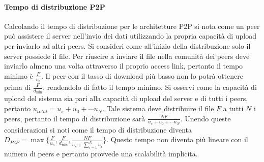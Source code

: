 \paragraph{Tempo di distribuzione P2P}
Calcolando il tempo di distribuzione per le architetture P2P si nota come un peer pu\`o assistere il server nell'invio dei dati utilizzando la propria 
capacit\`a di upload per inviarlo ad altri peers. Si consideri come all'inizio della distribuzione solo il server possiede il file. Per riuscire a inviare 
il file nella comunit\`a dei peers deve inviarlo almeno una volta attraverso il proprio access link, pertanto il tempo minimo \`e $\frac{F}{u_s}$. Il peer
con il tasso di download pi\`u basso non lo potr\`a ottenere prima di $\frac{F}{d_{\min}}$, rendendolo di fatto il tempo minimo. Si osservi come la 
capacit\`a di upload del sistema sia pari alla capacit\`a di upload del server e di tutti i peers, pertanto $u_{total}=u_s+u_0+\cdots u_N$. Tale sistema 
deve distribuire il file $F$ a tutti $N$ i peers, pertanto il tempo di distribuzione sar\`a $\frac{NF}{u_s+u_0+\cdots u_N}$. Unendo queste considerazioni si 
noti come il tempo di distribuzione diventa $D_{P2P}=\max\{\frac{F}{u_s}, \frac{F}{d_{\min}}, \frac{NF}{u_s+\sum\limits_{i=1}^Nu_i}\}$. Questo tempo non 
diventa pi\`u lineare con il numero di peers e pertanto provvede una scalabilit\`a implicita.
